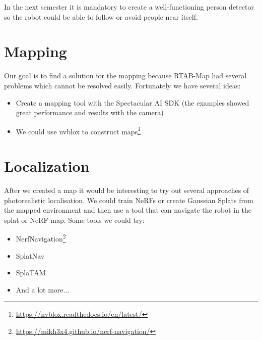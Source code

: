 In the next semester it is mandatory to create a well-functioning person detector so the robot could be able to follow or avoid people near itself.

\section{Mapping}

Our goal is to find a solution for the mapping because RTAB-Map had several problems which cannot be resolved easily. Fortunately we have several ideas:

\begin{itemize}
    \item Create a mapping tool with the Spectacular AI SDK (the examples showed great performance and results with the camera)
    \item We could use nvblox to construct maps\footnote{\url{https://nvblox.readthedocs.io/en/latest/}}
\end{itemize}

\section{Localization}

After we created a map it would be interesting to try out several approaches of photorealistic localisation. We could train NeRFs or create Gaussian Splats from the mapped environment and then use a tool that can navigate the robot in the splat or NeRF map. Some tools we could try:
\begin{itemize}
    \item NerfNavigation\footnote{\url{https://mikh3x4.github.io/nerf-navigation/}}
    \item SplatNav\cite{splatnav}
    \item SplaTAM\cite{splatam}
    \item And a lot more...\cite{nerf_robotics_cites}
\end{itemize}
